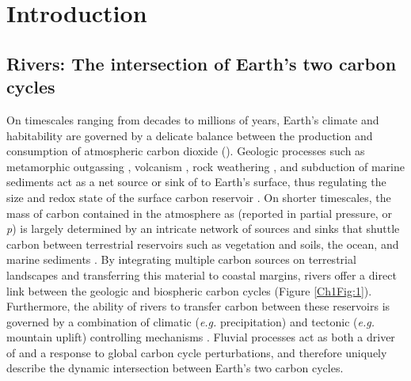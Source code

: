 \chapter{Introduction}
\label{Ch1}
\raggedbottom
\clearpage

\section{Rivers: The intersection of Earth's two carbon cycles}

On timescales ranging from decades to millions of years, Earth's climate and habitability are governed by a delicate balance between the production and consumption of atmospheric carbon dioxide (). Geologic processes such as metamorphic outgassing \citep{Becker:2008bd}, volcanism \citep{Marty:1998vo}, rock weathering \citep{Walker:1981wn}, and subduction of marine sediments \citep{Kelemen:2015ec} act as a net source or sink of  to Earth's surface, thus regulating the size and redox state of the surface carbon reservoir \citep{Hayes:2006ca}. On shorter timescales, the mass of carbon contained in the atmosphere as  (reported in partial pressure, or \textit{p}) is largely determined by an intricate network of sources and sinks that shuttle carbon between terrestrial reservoirs such as vegetation and soils, the ocean, and marine sediments \citep[collectively termed the "biosphere";][]{Sarmiento:2006wz}. By integrating multiple carbon sources on terrestrial landscapes and transferring this material to coastal margins, rivers offer a direct link between the geologic and biospheric carbon cycles (Figure \ref{Ch1Fig:1}). Furthermore, the ability of rivers to transfer carbon between these reservoirs is governed by a combination of climatic (\textit{e.g.} precipitation) and tectonic (\textit{e.g.} mountain uplift) controlling mechanisms \citep{Molnar:1990um}. Fluvial processes act as both a driver of and a response to global carbon cycle perturbations, and therefore uniquely describe the dynamic intersection between Earth's two carbon cycles.

